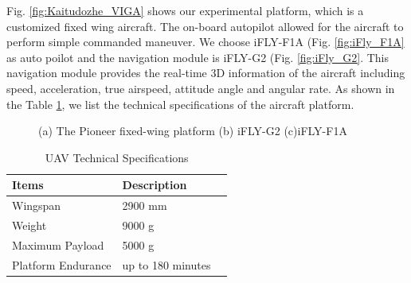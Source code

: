 Fig. \ref{fig:Kaitudozhe_VIGA} shows our experimental platform, which is a customized fixed wing aircraft. The on-board autopilot allowed for the aircraft to perform simple commanded maneuver. We choose iFLY-F1A (Fig. \ref{fig:iFly_F1A} as auto poilot and the navigation module is iFLY-G2 (Fig. \ref{fig:iFly_G2}. This navigation module provides the real-time 3D information of the aircraft including speed, acceleration, true airspeed, attitude angle and angular rate. As shown in the Table \ref{tab:platform_specifications}, we list the technical specifications of the aircraft platform.

\begin{figure}[!tb]
	\centering
	
	\caption{(a) The Pioneer fixed-wing platform (b) iFLY-G2 (c)iFLY-F1A   }
\end{figure}



\begin{table}
	\caption{UAV Technical Specifications}
	\label{tab:platform_specifications}
	\begin{center}
		\renewcommand{\arraystretch}{1.1}
		\begin{tabular}{lll}
			\hline
			\textbf {Items}  & \textbf{Description} \\
			\hline
			Wingspan & 2900 mm \\
			Weight & 9000 g \\
			Maximum Payload & 5000 g \\
			Platform Endurance & up to 180 minutes \\									
			\hline
		\end{tabular}
	\end{center}
\end{table}

